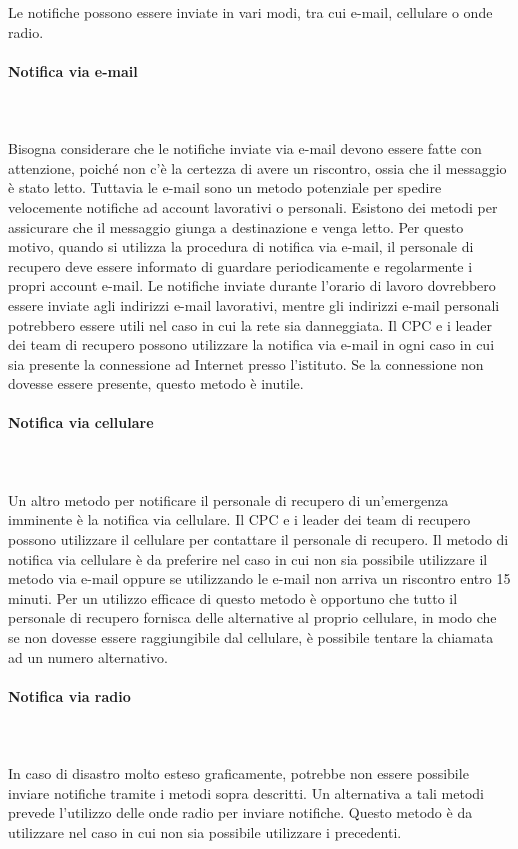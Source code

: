 \documentclass[12pt, a4paper, titlepage]{report}
\newcommand{\myparagraph}[1]{\paragraph{#1}\mbox{} \mbox{}}
\begin{document}
	Le notifiche possono essere inviate in vari modi, tra cui e-mail, cellulare o onde radio.
	
	\myparagraph{Notifica via e-mail}\\
	\\Bisogna considerare che le notifiche inviate via e-mail devono essere fatte con attenzione, poiché non c'è la certezza di avere un riscontro, ossia che il messaggio è stato letto. Tuttavia le e-mail sono un metodo potenziale per spedire velocemente notifiche ad account lavorativi o personali. Esistono dei metodi per assicurare che il messaggio giunga a destinazione e venga letto. Per questo motivo, quando si utilizza la procedura di notifica via e-mail, il personale di recupero deve essere informato di guardare periodicamente e regolarmente i propri account e-mail. Le notifiche inviate durante l'orario di lavoro dovrebbero essere inviate agli indirizzi e-mail lavorativi, mentre gli indirizzi e-mail personali potrebbero essere utili nel caso in cui la rete sia danneggiata. Il CPC e i leader dei team di recupero possono utilizzare la notifica via e-mail in ogni caso in cui sia presente la connessione ad Internet presso l'istituto. Se la connessione non dovesse essere presente, questo metodo è inutile.
	
	\myparagraph{Notifica via cellulare}\\
	\\Un altro metodo per notificare il personale di recupero di un'emergenza imminente è la notifica via cellulare. Il CPC e i leader dei team di recupero possono utilizzare il cellulare per contattare il personale di recupero. Il metodo di notifica via cellulare è da preferire nel caso in cui non sia possibile utilizzare il metodo via e-mail oppure se utilizzando le e-mail non arriva un riscontro entro 15 minuti. Per un utilizzo efficace di questo metodo è opportuno che tutto il personale di recupero fornisca delle alternative al proprio cellulare, in modo che se non dovesse essere raggiungibile dal cellulare, è possibile tentare la chiamata ad un numero alternativo.
	
	\myparagraph{Notifica via radio}\\
	\\In caso di disastro molto esteso graficamente, potrebbe non essere possibile inviare notifiche tramite i metodi sopra descritti. Un alternativa a tali metodi prevede l'utilizzo delle onde radio per inviare notifiche. Questo metodo è da utilizzare nel caso in cui non sia possibile utilizzare i precedenti.
	
\end{document}
